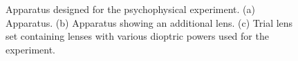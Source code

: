 \begin{figure}[!htb]
	\centering
	\caption[Apparatus designed for the psychophysical experiment]{Apparatus designed for the psychophysical experiment. (a) Apparatus. (b) Apparatus showing an additional lens. (c) Trial lens set containing lenses with various dioptric powers used for the experiment.}
	\label{fig:apparatus_with_extra_lens}
\end{figure}

